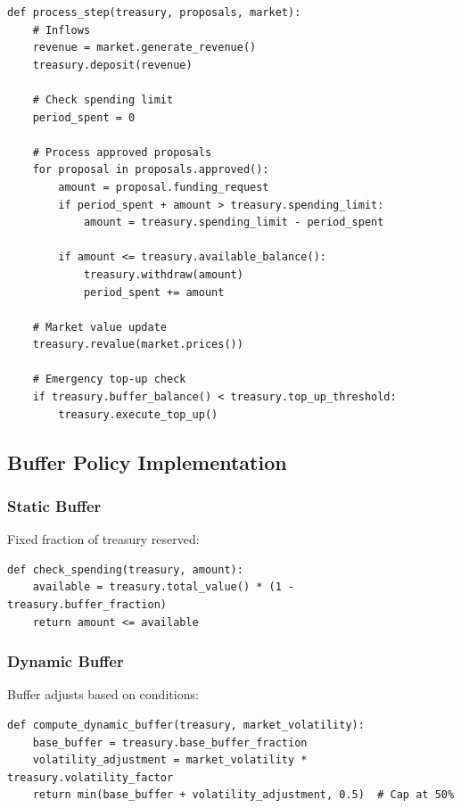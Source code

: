 \begin{lstlisting}[caption=Treasury flow processing (pseudocode)]
def process_step(treasury, proposals, market):
    # Inflows
    revenue = market.generate_revenue()
    treasury.deposit(revenue)

    # Check spending limit
    period_spent = 0

    # Process approved proposals
    for proposal in proposals.approved():
        amount = proposal.funding_request
        if period_spent + amount > treasury.spending_limit:
            amount = treasury.spending_limit - period_spent

        if amount <= treasury.available_balance():
            treasury.withdraw(amount)
            period_spent += amount

    # Market value update
    treasury.revalue(market.prices())

    # Emergency top-up check
    if treasury.buffer_balance() < treasury.top_up_threshold:
        treasury.execute_top_up()
\end{lstlisting}

\subsection{Buffer Policy Implementation}

\subsubsection{Static Buffer}

Fixed fraction of treasury reserved:

\begin{lstlisting}[caption=Static buffer policy (pseudocode)]
def check_spending(treasury, amount):
    available = treasury.total_value() * (1 - treasury.buffer_fraction)
    return amount <= available
\end{lstlisting}

\subsubsection{Dynamic Buffer}

Buffer adjusts based on conditions:

\begin{lstlisting}[caption=Dynamic buffer policy (pseudocode)]
def compute_dynamic_buffer(treasury, market_volatility):
    base_buffer = treasury.base_buffer_fraction
    volatility_adjustment = market_volatility * treasury.volatility_factor
    return min(base_buffer + volatility_adjustment, 0.5)  # Cap at 50%
\end{lstlisting}

